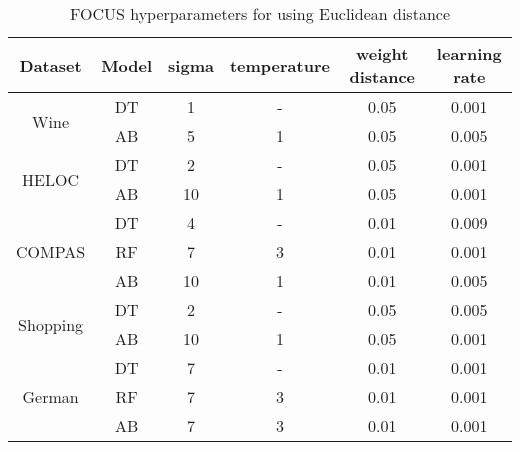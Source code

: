 \begin{table}[htb]
\centering
\begin{tabular}{cccccc}
Dataset                   & Model & sigma & temperature & weight distance & learning rate \\ \hline
\multirow{2}{*}{Wine}     & DT    & 1     & -          & 0.05            & 0.001         \\
                          & AB    & 5     & 1           & 0.05            & 0.005         \\ \hline
\multirow{2}{*}{HELOC}    & DT    & 2     & -          & 0.05            & 0.001         \\
                          & AB    & 10    & 1           & 0.05            & 0.001         \\ \hline
\multirow{3}{*}{COMPAS}   & DT    & 4     & -          & 0.01            & 0.009         \\
                          & RF    & 7     & 3           & 0.01            & 0.001         \\
                          & AB    & 10    & 1           & 0.01            & 0.005         \\ \hline
\multirow{2}{*}{Shopping} & DT    & 2     & -          & 0.05            & 0.005         \\
                          & AB    & 10    & 1           & 0.05            & 0.001         \\ \hline
\multirow{3}{*}{German}   & DT    & 7     & -           & 0.01            & 0.001         \\
                          & RF    & 7     & 3           & 0.01            & 0.001         \\
                          & AB    & 7     & 3           & 0.01            & 0.001         \\ \hline
\end{tabular}
\caption{FOCUS hyperparameters for using Euclidean distance}
\label{table:euclidean params}
\end{table}


